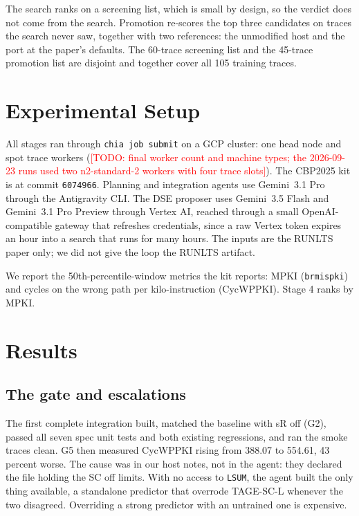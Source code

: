 \documentclass[conference]{IEEEtran}
\newcommand{\todo}[1]{\textcolor{red}{[TODO: #1]}}
\begin{document}
The search ranks on a screening list, which is small by design, so the verdict
does not come from the search. Promotion re-scores the top three candidates on
traces the search never saw, together with two references: the unmodified host
and the port at the paper's defaults. The 60-trace screening list and the
45-trace promotion list are disjoint and together cover all 105 training
traces.

\section{Experimental Setup}

All stages ran through \texttt{chia job submit} on a GCP cluster: one head node
and spot trace workers (\todo{final worker count and machine types; the
2026-09-23 runs used two n2-standard-2 workers with four trace slots}). The
CBP2025 kit is at commit \texttt{6074966}. Planning and integration agents use
Gemini~3.1 Pro through the Antigravity CLI. The DSE proposer uses Gemini~3.5
Flash and Gemini~3.1 Pro Preview through Vertex AI, reached through a small
OpenAI-compatible gateway that refreshes credentials, since a raw Vertex token
expires an hour into a search that runs for many hours. The inputs are the
RUNLTS paper only; we did not give the loop the RUNLTS artifact.

We report the 50th-percentile-window metrics the kit reports: MPKI
(\texttt{brmispki}) and cycles on the wrong path per kilo-instruction
(CycWPPKI). Stage 4 ranks by MPKI.

\section{Results}\label{sec:results}

\subsection{The gate and escalations}

The first complete integration built, matched the baseline with sR off (G2),
passed all seven spec unit tests and both existing regressions, and ran the
smoke traces clean. G5 then measured CycWPPKI rising from 388.07 to 554.61, 43
percent worse. The cause was in our host notes, not in the agent: they declared
the file holding the SC off limits. With no access to \texttt{LSUM}, the agent
built the only thing available, a standalone predictor that overrode TAGE-SC-L
whenever the two disagreed. Overriding a strong predictor with an untrained one
is expensive.
\end{document}
